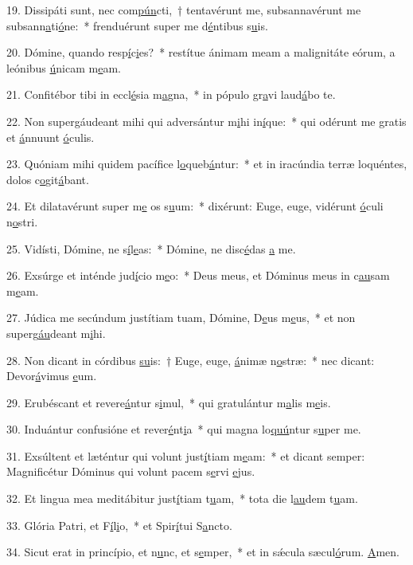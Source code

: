 19. Dissipáti sunt, nec com\uline{pún}cti,~† tentavérunt me, subsannavérunt me subsann\uline{a}ti\uline{ó}ne:~* frenduérunt super me d\uline{é}ntibus s\uline{u}is.\par 
20. Dómine, quando resp\uline{í}c\uline{i}es?~* restítue ánimam meam a malignitáte eórum, a leónibus \uline{ú}nicam m\uline{e}am.\par 
21. Confitébor tibi in eccl\uline{é}sia m\uline{a}gna,~* in pópulo gr\uline{a}vi laud\uline{á}bo te.\par 
22. Non supergáudeant mihi qui adversántur m\uline{i}hi in\uline{í}que:~* qui odérunt me gratis et \uline{á}nnuunt \uline{ó}culis.\par 
23. Quóniam mihi quidem pacífice l\uline{o}queb\uline{á}ntur:~* et in iracúndia terræ loquéntes, dolos c\uline{o}git\uline{á}bant.\par 
24. Et dilatavérunt super m\uline{e} os s\uline{u}um:~* dixérunt: Euge, euge, vidérunt \uline{ó}culi n\uline{o}stri.\par 
25. Vidísti, Dómine, ne s\uline{í}l\uline{e}as:~* Dómine, ne disc\uline{é}das \uline{a} me.\par 
26. Exsúrge et inténde jud\uline{í}cio m\uline{e}o:~* Deus meus, et Dóminus meus in c\uline{au}sam m\uline{e}am.\par 
27. Júdica me secúndum justítiam tuam, Dómine, D\uline{e}us m\uline{e}us,~* et non superg\uline{áu}deant m\uline{i}hi.\par 
28. Non dicant in córdibus \uline{su}is:~† Euge, euge, \uline{á}nimæ n\uline{o}stræ:~* nec dicant: Devor\uline{á}vimus \uline{e}um.\par 
29. Erubéscant et revere\uline{á}ntur s\uline{i}mul,~* qui gratulántur m\uline{a}lis m\uline{e}is.\par 
30. Induántur confusióne et rever\uline{é}nt\uline{i}a~* qui magna lo\uline{quú}ntur s\uline{u}per me.\par 
31. Exsúltent et læténtur qui volunt just\uline{í}tiam m\uline{e}am:~* et dicant semper: Magnificétur Dóminus qui volunt pacem s\uline{e}rvi \uline{e}jus.\par 
32. Et lingua mea meditábitur just\uline{í}tiam t\uline{u}am,~* tota die l\uline{au}dem t\uline{u}am.\par 
33. Glória Patri, et F\uline{í}l\uline{i}o,~* et Spir\uline{í}tui S\uline{a}ncto.\par 
34. Sicut erat in princípio, et n\uline{u}nc, et s\uline{e}mper,~* et in sǽcula sæcul\uline{ó}rum. \uline{A}men.\par 
